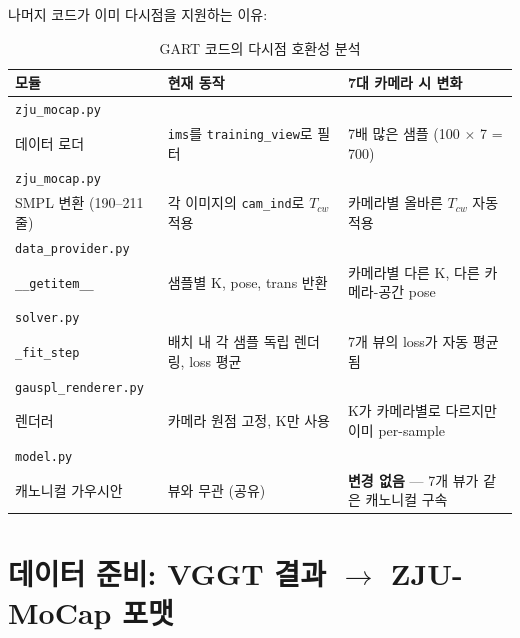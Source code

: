 \documentclass[11pt, a4paper]{report}
\begin{document}
나머지 코드가 이미 다시점을 지원하는 이유:

\begin{table}[H]
\centering
\caption{GART 코드의 다시점 호환성 분석}
\renewcommand{\arraystretch}{1.4}
\small
\begin{tabular}{p{3.5cm} p{4cm} p{5cm}}
\toprule
\textbf{모듈} & \textbf{현재 동작} & \textbf{7대 카메라 시 변화} \\
\midrule
\texttt{zju\_mocap.py}\\데이터 로더 & \texttt{ims}를 \texttt{training\_view}로 필터 & 7배 많은 샘플 (100 $\times$ 7 = 700) \\
\midrule
\texttt{zju\_mocap.py}\\SMPL 변환 (190--211줄) & 각 이미지의 \texttt{cam\_ind}로 $T_{cw}$ 적용 & 카메라별 올바른 $T_{cw}$ 자동 적용 \\
\midrule
\texttt{data\_provider.py}\\\texttt{\_\_getitem\_\_} & 샘플별 K, pose, trans 반환 & 카메라별 다른 K, 다른 카메라-공간 pose \\
\midrule
\texttt{solver.py}\\\texttt{\_fit\_step} & 배치 내 각 샘플 독립 렌더링, loss 평균 & 7개 뷰의 loss가 자동 평균됨 \\
\midrule
\texttt{gauspl\_renderer.py}\\렌더러 & 카메라 원점 고정, K만 사용 & K가 카메라별로 다르지만 이미 per-sample \\
\midrule
\texttt{model.py}\\캐노니컬 가우시안 & 뷰와 무관 (공유) & \textbf{변경 없음} --- 7개 뷰가 같은 캐노니컬 구속 \\
\bottomrule
\end{tabular}
\end{table}


\section{데이터 준비: VGGT 결과 $\rightarrow$ ZJU-MoCap 포맷}
\end{document}

